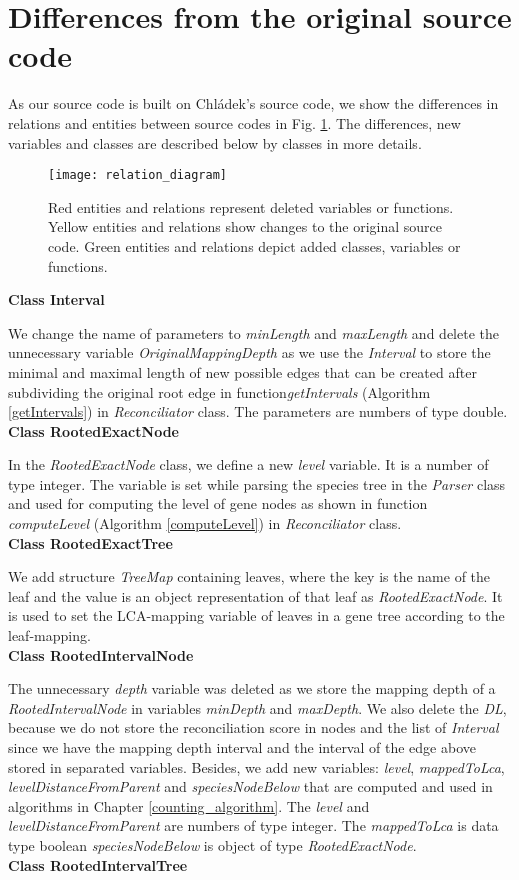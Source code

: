 \section{Differences from the original source code}

As our source code is built on Chládek's source code, we show the differences in relations and entities between source codes in Fig. \ref{relation_diagram}. The differences, new variables and classes are described below by classes in more details.\\
\begin{figure}[ht!]
	\centering
	\label{relation_diagram}
  	\texttt{[image: relation\_diagram]}
  	\caption[Entity-relationship diagram with differences]{Red entities and relations represent deleted variables or functions. Yellow entities and relations show changes to the original source code. Green entities and relations depict added classes, variables or functions.}
\end{figure}
\textbf{Class Interval}

We change the name of parameters to \emph{minLength} and \emph{maxLength} and delete the unnecessary variable \emph{OriginalMappingDepth} as we use the \emph{Interval} to store the minimal and maximal length of new possible edges that can be created after subdividing the original root edge in function\emph{getIntervals} (Algorithm \ref{getIntervals}) in \emph{Reconciliator} class. The parameters are numbers of type double.\\
\textbf{Class RootedExactNode}

In the \emph{RootedExactNode} class, we define a new \emph{level} variable. It is a number of type integer. The variable is set while parsing the species tree in the \emph{Parser} class and used for computing the level of gene nodes as shown in function \emph{computeLevel} (Algorithm \ref{computeLevel}) in \emph{Reconciliator} class.\\
\textbf{Class RootedExactTree}

We add structure \emph{TreeMap} containing leaves, where the key is the name of the leaf and the value is an object representation of that leaf as \emph{RootedExactNode}. It is used to set the LCA-mapping variable of leaves in a gene tree according to the leaf-mapping.\\
\textbf{Class RootedIntervalNode}

The unnecessary \emph{depth} variable was deleted as we store the mapping depth of a \emph{RootedIntervalNode} in variables \emph{minDepth} and \emph{maxDepth}. We also delete the \emph{DL}, because we do not store the reconciliation score in nodes and the list of \emph{Interval} since we have the mapping depth interval and the interval of the edge above stored in separated variables. Besides, we add new variables: \emph{level}, \emph{mappedToLca}, \emph{levelDistanceFromParent} and \emph{speciesNodeBelow} that are computed and used in algorithms in Chapter \ref{counting_algorithm}. The \emph{level} and \emph{levelDistanceFromParent} are numbers of type integer. The \emph{mappedToLca} is data type boolean \emph{speciesNodeBelow} is object of type \emph{RootedExactNode}.\\
\textbf{Class RootedIntervalTree}

